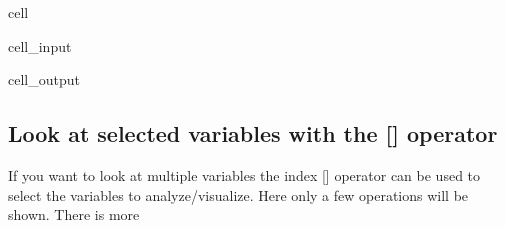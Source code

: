 \documentclass[letterpaper,10pt,english]{jupyterBook}
\begin{document}
\begin{sphinxuseclass}{cell}
\begin{sphinxVerbatimInput}
\begin{sphinxuseclass}{cell_input}
\end{sphinxuseclass}\end{sphinxVerbatimInput}
\begin{sphinxVerbatimOutput}

\begin{sphinxuseclass}{cell_output}
\noindent{}

\noindent{}

\end{sphinxuseclass}\end{sphinxVerbatimOutput}

\end{sphinxuseclass}

\subsection{Look at selected variables with the {[}{]} operator}
\label{\detokenize{content/howto/targetinstruments/One target one instrument with 3 instrument variables:look-at-selected-variables-with-the-operator}}
\sphinxAtStartPar
If you want to look at multiple variables the index {[}{]} operator can be used to select the variables to analyze/visualize. Here only a few operations will be shown. There is more {\hyperref[\detokenize{content/notebooks/modelflow_features:index-operator}]{}}
\end{document}
